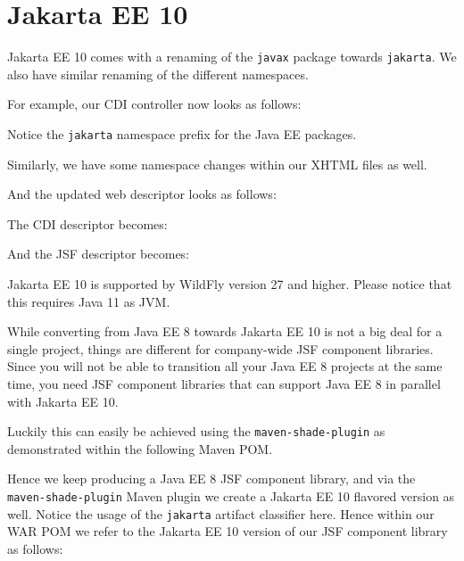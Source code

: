 %

\chapter{Jakarta EE 10}

Jakarta EE 10 comes with a renaming of the \texttt{javax} package towards \texttt{jakarta}.
We also have similar renaming of the different namespaces.

For example, our CDI controller now looks as follows:

Notice the \texttt{jakarta} namespace prefix for the Java EE packages.

Similarly, we have some namespace changes within our XHTML files as well.

And the updated web descriptor looks as follows:

The CDI descriptor becomes:

And the JSF descriptor becomes:


Jakarta EE 10 is supported by WildFly version 27 and higher.
Please notice that this requires Java 11 as JVM.

While converting from Java EE 8 towards Jakarta EE 10 is not a big deal for a single project, things are different for company-wide JSF component libraries.
Since you will not be able to transition all your Java EE 8 projects at the same time, you need JSF component libraries that can support Java EE 8 in parallel with Jakarta EE 10.

Luckily this can easily be achieved using the \texttt{maven-shade-plugin} as demonstrated within the following Maven POM.

Hence we keep producing a Java EE 8 JSF component library, and via the \texttt{maven-shade-plugin} Maven plugin we create a Jakarta EE 10 flavored version as well.
Notice the usage of the \texttt{jakarta} artifact classifier here.
Hence within our WAR POM we refer to the Jakarta EE 10 version of our JSF component library as follows:
